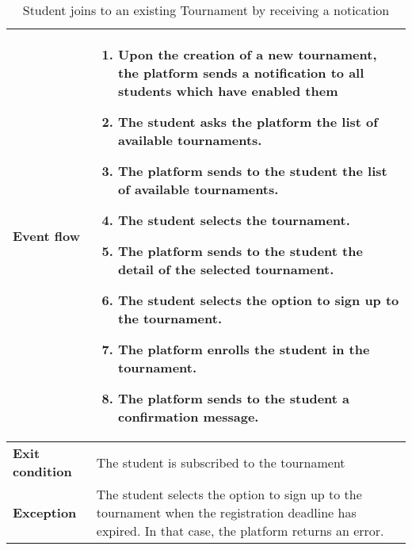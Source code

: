 \begin{enumerate}[label=\textbf{UC\arabic*}:,ref=UC\arabic*,leftmargin=1.3cm]
{\begin{table}[H]
\begin{tabular}{|l|p{11.9cm}|}
                        \textbf{Event flow}      &
                        \begin{enumerate}[label=\arabic*.]
                              \item Upon the creation of a new tournament, the platform sends a notification to all students which have enabled them
                              \item The student asks the platform the list of available tournaments.
                              \item The platform sends to the student the list of available tournaments.
                              \item The student selects the tournament.
                              \item The platform sends to the student the detail of the selected tournament.
                              \item The student selects the option to sign up to the tournament.
                              \item The platform enrolls the student in the tournament.
                              \item The platform sends to the student a confirmation message.
                        \end{enumerate}              \\\hline
                        \textbf{Exit condition}  & The student is subscribed to the tournament                                                             \\\hline
                        \textbf{Exception}       & The student selects the option to sign up to the tournament when the registration deadline has expired.
                        In that case, the platform returns an error.                                                                                       \\\hline
                  \end{tabular}
                  \caption{Student joins to an existing Tournament by receiving a notication}
                  \label{table:Student joins to an existing Tournament by receiving a notication}
            \end{table}
            \begin{adjustbox}{
                        max size={\textwidth}{},
                        caption={Student joins to an existing Tournament by receiving a notication},
                        label={fig:Student joins to an existing Tournament by receiving a notication},
}
\end{adjustbox}}
\end{enumerate}
